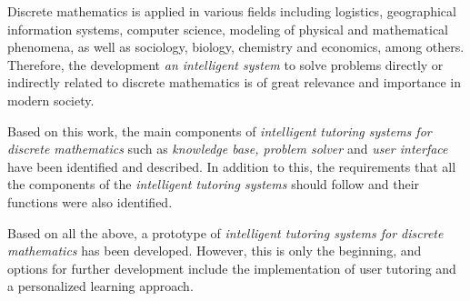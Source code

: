 \documentclass [11pt, a4paper]{article}
\begin{document}
\begin{multicols}{2}
\par\quad Discrete mathematics is applied in various fields including logistics, geographical information systems, computer science, modeling of physical and mathematical
phenomena, as well as sociology, biology, chemistry and economics, among others. Therefore, the development \textit {an intelligent system} to solve problems directly or indirectly related to discrete mathematics is of great relevance and importance in modern society. \par \quad Based on this work, the main components of \textit{intelligent tutoring systems for discrete mathematics} such as \textit{knowledge base, problem solver} and \textit{user interface} have been identified and described. In addition to this, the requirements that all the components of the \textit{intelligent tutoring systems} should follow and their functions were also identified. \par \quad Based on all the above, a prototype of \textit{intelligent tutoring systems for discrete mathematics} has been developed. However, this is only the beginning, and options for further development include the implementation of user tutoring and a personalized learning approach.
\\\quad
\begin{center}


\end{center}
\end{multicols}
\end{document}
